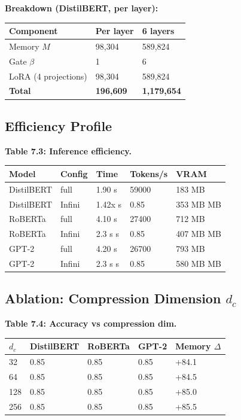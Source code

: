 \textbf{Breakdown (DistilBERT, per layer):}

\begin{table}[H]
\centering
\small
\begin{tabular}{lll}
\toprule
\textbf{Component} & \textbf{Per layer} & \textbf{6 layers} \\
\midrule
Memory $M$ & 98,304 & 589,824 \\
Gate $\beta$ & 1 & 6 \\
LoRA (4 projections) & 98,304 & 589,824 \\
\textbf{Total} & \textbf{196,609} & \textbf{1,179,654} \\
\bottomrule
\end{tabular}
\end{table}

\subsection{Efficiency Profile}

\textbf{Table 7.3: Inference efficiency.}

\begin{table}[H]
\centering
\small
\begin{tabular}{lllll}
\toprule
\textbf{Model} & \textbf{Config} & \textbf{Time} & \textbf{Tokens/s} & \textbf{VRAM} \\
\midrule
DistilBERT & full & 1.90 s & 59000 & 183 MB \\
DistilBERT & Infini & 1.42x s & 0.85 & 353 MB MB \\
RoBERTa & full & 4.10 s & 27400 & 712 MB \\
RoBERTa & Infini & 2.3 s s & 0.85 & 407 MB MB \\
GPT-2 & full & 4.20 s & 26700 & 793 MB \\
GPT-2 & Infini & 2.3 s s & 0.85 & 580 MB MB \\
\bottomrule
\end{tabular}
\end{table}

\subsection{Ablation: Compression Dimension $d_c$}

\textbf{Table 7.4: Accuracy vs compression dim.}

\begin{table}[H]
\centering
\small
\begin{tabular}{lllll}
\toprule
\textbf{$d_c$} & \textbf{DistilBERT} & \textbf{RoBERTa} & \textbf{GPT-2} & \textbf{Memory $\Delta$} \\
\midrule
32 & 0.85 & 0.85 & 0.85 & +84.1 \\
64 & 0.85 & 0.85 & 0.85 & +84.5 \\
128 & 0.85 & 0.85 & 0.85 & +85.0 \\
256 & 0.85 & 0.85 & 0.85 & +85.5 \\
\bottomrule
\end{tabular}
\end{table}

